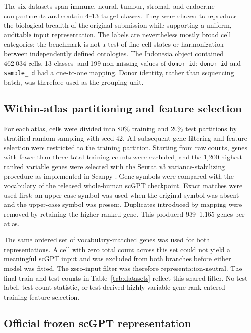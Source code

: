 The six datasets span immune, neural, tumour, stromal, and endocrine compartments and contain 4--13 target classes. They were chosen to reproduce the biological breadth of the original submission while supporting a uniform, auditable input representation. The labels are nevertheless mostly broad cell categories; the benchmark is not a test of fine cell states or harmonization between independently defined ontologies. The Indonesia object contained 462,034 cells, 13 classes, and 199 non-missing values of \texttt{donor\_id}; \texttt{donor\_id} and \texttt{sample\_id} had a one-to-one mapping. Donor identity, rather than sequencing batch, was therefore used as the grouping unit.

\subsection{Within-atlas partitioning and feature selection}

For each atlas, cells were divided into 80\% training and 20\% test partitions by stratified random sampling with seed 42. All subsequent gene filtering and feature selection were restricted to the training partition. Starting from raw counts, genes with fewer than three total training counts were excluded, and the 1,200 highest-ranked variable genes were selected with the Seurat v3 variance-stabilizing procedure as implemented in Scanpy \citep{Stuart2019,Wolf2018}. Gene symbols were compared with the vocabulary of the released whole-human scGPT checkpoint. Exact matches were used first; an upper-case symbol was used when the original symbol was absent and the upper-case symbol was present. Duplicates introduced by mapping were removed by retaining the higher-ranked gene. This produced 939--1,165 genes per atlas.

The same ordered set of vocabulary-matched genes was used for both representations. A cell with zero total count across this set could not yield a meaningful scGPT input and was excluded from both branches before either model was fitted. The zero-input filter was therefore representation-neutral. The final train and test counts in Table~\ref{tab:datasets} reflect this shared filter. No test label, test count statistic, or test-derived highly variable gene rank entered training feature selection.

\subsection{Official frozen scGPT representation}

